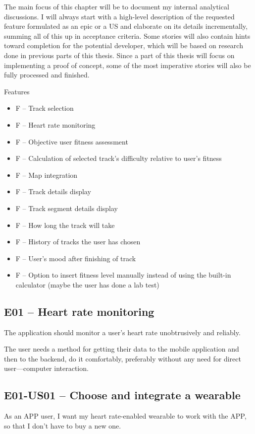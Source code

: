 The main focus of this chapter will be to document my internal analytical discussions.
I will always start with a high-level description of the requested feature formulated as an epic or a US and elaborate on its details incrementally, summing all of this up in acceptance criteria.
Some stories will also contain hints toward completion for the potential developer, which will be based on research done in previous parts of this thesis.
Since a part of this thesis will focus on implementing a proof of concept, some of the most imperative stories will also be fully processed and finished.

Features
\begin{itemize}
    \item F -- Track selection
    \item F -- Heart rate monitoring
    \item F -- Objective user fitness assessment
    \item F -- Calculation of selected track's difficulty relative to user's fitness
    \item F -- Map integration
    \item F -- Track details display
    \item F -- Track segment details display
    \item F -- How long the track will take
    \item F -- History of tracks the user has chosen
    \item F -- User's mood after finishing of track
    \item F -- Option to insert fitness level manually instead of using the built-in calculator (maybe the user has done a lab test)
\end{itemize}

\subsection*{E01 -- Heart rate monitoring}
The application should monitor a user's heart rate unobtrusively and reliably.

The user needs a method for getting their data to the mobile application and then to the backend, do it comfortably, preferably without any need for direct user---computer interaction.

\subsection*{E01-US01 -- Choose and integrate a wearable}
As an APP user, I want my heart rate-enabled wearable to work with the APP, so that I don't have to buy a new one.

